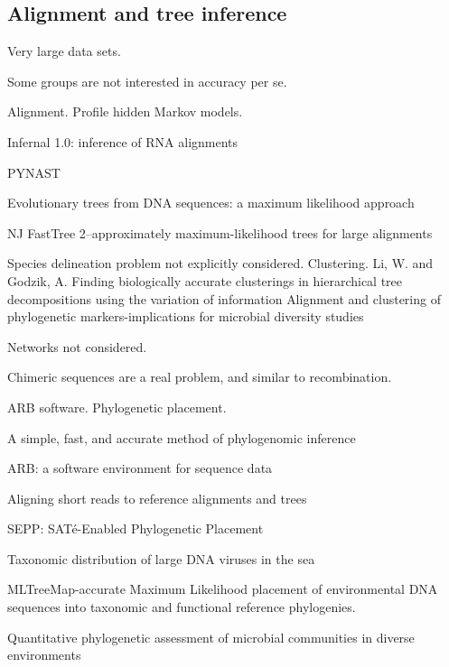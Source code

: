 \documentclass{amsart}
\begin{document}
\subsection{Alignment and tree inference}

Very large data sets.

Some groups are not interested in accuracy per se.

Alignment.
\cite{eddy1998profile}
Profile hidden Markov models.

\cite{nawrocki2009infernal}
Infernal 1.0: inference of RNA alignments

PYNAST


\cite{felsenstein1981evolutionary}
{Evolutionary trees from DNA sequences: a maximum likelihood approach}

NJ
\cite{price2010fasttree}
{FastTree 2--approximately maximum-likelihood trees for large alignments}

Species delineation problem not explicitly considered. Clustering.
\cite{li2006cdhit}
Li, W.  and Godzik, A.
\cite{edgar2010usearch}
\cite{navlakha2009finding} Finding biologically accurate clusterings in hierarchical tree decompositions using the variation of information
\cite{white2010alignment} Alignment and clustering of phylogenetic markers-implications for microbial diversity studies

Networks not considered.

Chimeric sequences are a real problem, and similar to recombination.

ARB software.
Phylogenetic placement.

\cite{wu2008simple}
A simple, fast, and accurate method of phylogenomic inference

\cite{matsen2010pplacer}

\cite{ludwig2004arb}
{{ARB}: a software environment for sequence data}
\cite{berger2011performance}

\cite{berger2011aligning}
Aligning short reads to reference alignments and trees

\cite{mirarabsepp}
{SEPP: SAT{\'e}-Enabled Phylogenetic Placement}

\cite{monierEaLargeViruses08}
{Taxonomic distribution of large DNA viruses in the sea}

\cite{stark2010mltreemap}
{{MLTreeMap}-accurate Maximum Likelihood placement of environmental DNA sequences into taxonomic and functional reference phylogenies.}

\cite{vonMeringEaQuantitative08}
{Quantitative phylogenetic assessment of microbial communities in diverse environments}
\end{document}
